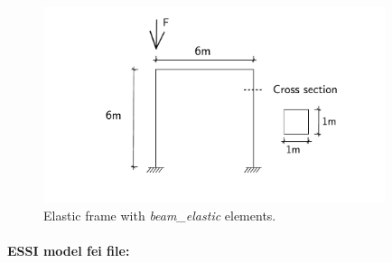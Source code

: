 \begin{figure}[!htb]
  \centering
  \includegraphics[width=10cm]{./Figure-files/_Chapter_Appendix_Illustrative_Examples/beam_elastic_frame_descrip.pdf}
  \caption{Elastic frame with \emph{beam\_elastic} elements.}
  \label{fig_frame}
\end{figure}





\paragraph{ESSI model fei file:} ~

